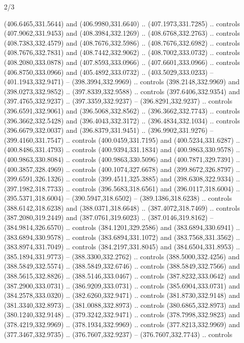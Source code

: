\begin{flagdescription}{2/3}
\begin{scope}[xshift=0.5\flaglength,yshift=0.5\flagwidth,scale=\flagwidth/311.22]
\begin{scope}[y=0.8pt, x=0.8pt, yscale=-1,shift={(-291.77,-194.51)}]
  (406.6465,331.5644) and (406.9980,331.6640) .. (407.1973,331.7285) .. controls
  (407.9062,331.9453) and (408.3984,332.1269) .. (408.6768,332.2763) .. controls
  (408.7383,332.4579) and (408.7676,332.5986) .. (408.7676,332.6982) .. controls
  (408.7676,332.7831) and (408.7442,332.9062) .. (408.7002,333.0732) .. controls
  (408.2080,333.0878) and (407.8593,333.0966) .. (407.6601,333.0966) .. controls
  (406.8750,333.0966) and (405.4892,333.0732) .. (403.5029,333.0233) --
  (401.1943,332.9471) -- (398.3994,332.9969) .. controls (398.2148,332.9969) and
  (398.0273,332.9852) .. (397.8339,332.9588) .. controls (397.6406,332.9354) and
  (397.4765,332.9237) .. (397.3359,332.9237) -- (396.8291,332.9237) .. controls
  (396.6591,332.9061) and (396.5068,332.8562) .. (396.3662,332.7743) .. controls
  (396.3662,332.5428) and (396.4043,332.3172) .. (396.4834,332.1034) .. controls
  (396.6679,332.0037) and (396.8379,331.9451) .. (396.9902,331.9276) --
  (399.4160,331.7547) .. controls (400.0459,331.7195) and (400.5234,331.6287) ..
  (400.8486,331.4793) .. controls (400.9394,331.1834) and (400.9863,330.9578) ..
  (400.9863,330.8084) .. controls (400.9863,330.5096) and (400.7871,329.7391) ..
  (400.3857,328.4969) .. controls (400.1074,327.6678) and (399.8672,326.8797) ..
  (399.6591,326.1326) .. controls (399.4511,325.3885) and (398.6308,322.9334) ..
  (397.1982,318.7733) .. controls (396.5683,318.6561) and (396.0117,318.6004) ..
  (395.5371,318.6004) -- (390.5947,318.6502) -- (389.1386,318.6238) .. controls
  (388.6142,318.6238) and (388.0371,318.6648) .. (387.4072,318.7469) .. controls
  (387.2080,319.2449) and (387.0761,319.6023) .. (387.0146,319.8162) --
  (384.9814,326.6570) .. controls (384.1201,329.2586) and (383.6894,330.6941) ..
  (383.6894,330.9578) .. controls (383.6894,331.1072) and (383.7568,331.3562) ..
  (383.8974,331.7049) .. controls (384.2197,331.8045) and (384.6504,331.8953) ..
  (385.1894,331.9773) -- (388.3300,332.2762) .. controls (388.5000,332.4256) and
  (388.5849,332.5574) .. (388.5849,332.6746) .. controls (388.5849,332.7566) and
  (388.5615,332.8826) .. (388.5146,333.0467) .. controls (387.8232,333.0642) and
  (387.2900,333.0731) .. (386.9209,333.0731) .. controls (385.6904,333.0731) and
  (384.2578,333.0320) .. (382.6260,332.9471) .. controls (381.8730,332.9148) and
  (381.3340,332.8973) .. (381.0088,332.8973) .. controls (380.6865,332.8973) and
  (380.1240,332.9148) .. (379.3242,332.9471) .. controls (378.7998,332.9823) and
  (378.4219,332.9969) .. (378.1934,332.9969) .. controls (377.8213,332.9969) and
  (377.3467,332.9735) .. (376.7607,332.9237) -- (376.7607,332.7743) .. controls

\end{scope}
\end{scope}
\end{flagdescription}
